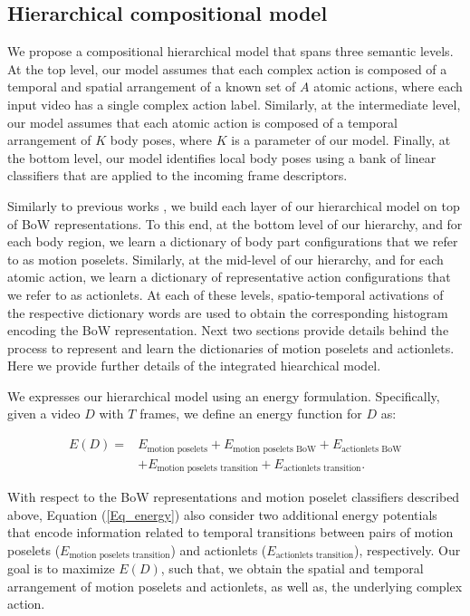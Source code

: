 \subsection{Hierarchical compositional model}

We propose a compositional hierarchical model that spans three semantic levels. 
At the top level, our model assumes that each complex action is composed of a 
temporal and spatial arrangement of a known set of $A$ atomic actions, where 
each input video has a single complex action label. Similarly, at the 
intermediate level, our model assumes that each atomic action is composed of a 
temporal arrangement of $K$ body poses, where $K$ is a parameter of 
our model. Finally, at the bottom level, our model identifies local body poses 
using a bank of linear classifiers that are applied to the incoming frame 
descriptors. 

Similarly to previous works \cite{Lillo2014, Taralova:EtAl:2014}, we build 
each layer of our hierarchical model on top of BoW 
representations. To this end, at the bottom level of our hierarchy, and for 
each body region, we learn a dictionary of body part configurations that we 
refer to as motion poselets. Similarly, at the mid-level of our hierarchy, and 
for each atomic action, we learn a dictionary of representative action 
configurations that we refer to as actionlets. At each of these levels, 
spatio-temporal activations of the respective dictionary words are used 
to obtain the corresponding histogram encoding the BoW representation. 
Next two sections provide 
details behind the process to represent and learn the dictionaries of motion 
poselets and actionlets. Here we provide further details of the 
integrated hiearchical model.

We expresses our hierarchical model using an energy formulation. 
Specifically, given a video $D$ with $T$ frames, we
define an energy function for $D$ as:

\begin{align}\label{Eq_energy}
E(D) = & E_{\text{motion poselets}} + E_{\text{motion poselets BoW}} + 
E_{\text{actionlets BoW}} \nonumber \\ 
& + E_{\text{motion poselets transition}} + E_{\text{actionlets 
transition}}.
\end{align}

With respect to the BoW representations and motion poselet classifiers 
described above, Equation (\ref{Eq_energy}) also 
consider two additional energy potentials that encode information related to 
temporal 
transitions between pairs of motion poselets ($E_{\text{motion poselets 
transition}}$) and 
actionlets ($E_{\text{actionlets transition}}$), respectively. Our goal is to 
maximize $E(D)$, such that, we obtain the 
spatial and temporal arrangement 
of motion poselets and actionlets, as well as, the underlying 
complex action. 

